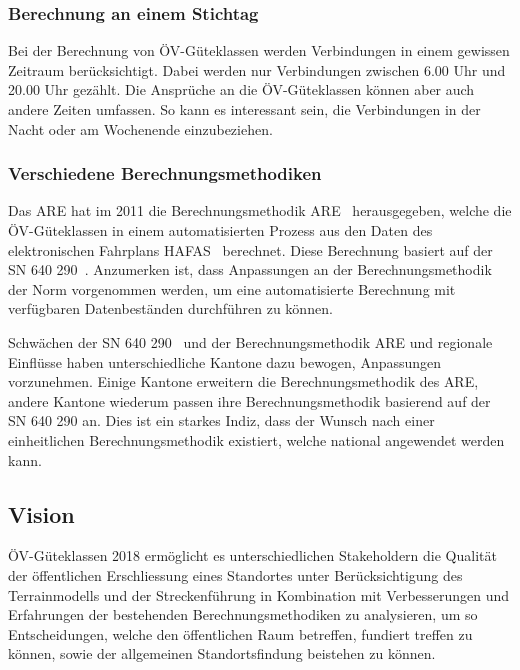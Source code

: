 \subsubsection{Berechnung an einem Stichtag}
\label{Problemstellung:Berechnung an einem Stichtag}

Bei der Berechnung von \acs{ÖV}-Güteklassen werden Verbindungen in einem gewissen Zeitraum berücksichtigt.
Dabei werden nur Verbindungen zwischen 6.00 Uhr und 20.00 Uhr gezählt.
Die Ansprüche an die \acs{ÖV}-Güteklassen können aber auch andere Zeiten umfassen.
So kann es interessant sein, die Verbindungen in der Nacht oder am Wochenende einzubeziehen.

\subsubsection{Verschiedene Berechnungsmethodiken}
\label{Problemstellung:Verschiedene Berechnungsmethodiken}

Das \ac{ARE} hat im 2011 die Berechnungsmethodik \acs{ARE}~\cite{berechnung_are} herausgegeben, welche die \acs{ÖV}-Güteklassen in einem automatisierten Prozess aus den Daten des elektronischen Fahrplans HAFAS~\cite{sbb_hafas_spec} berechnet.
Diese Berechnung basiert auf der \acs{SN} 640 290~\cite{sn640290}.
Anzumerken ist, dass Anpassungen an der Berechnungsmethodik der Norm vorgenommen werden, um eine automatisierte Berechnung mit verfügbaren Datenbeständen durchführen zu können.

Schwächen der \acs{SN} 640 290~\cite{sn640290} und der Berechnungsmethodik \acs{ARE} und regionale Einflüsse haben unterschiedliche Kantone dazu bewogen, Anpassungen vorzunehmen.
Einige Kantone erweitern die Berechnungsmethodik des \acs{ARE}, andere Kantone wiederum passen ihre Berechnungsmethodik basierend auf der \acs{SN} 640 290 an.
Dies ist ein starkes Indiz, dass der Wunsch nach einer einheitlichen Berechnungsmethodik existiert, welche national angewendet werden kann.

\subsection{Vision}
\label{Einführung:Vision}

\acs{ÖV}-Güteklassen 2018 ermöglicht es unterschiedlichen Stakeholdern die Qualität der öffentlichen Erschliessung eines Standortes unter Berücksichtigung des \gls{Terrainmodell}s und der Streckenführung in Kombination mit Verbesserungen und Erfahrungen der bestehenden Berechnungsmethodiken zu analysieren, um so Entscheidungen, welche den öffentlichen Raum betreffen, fundiert treffen zu können, sowie der allgemeinen Standortsfindung beistehen zu können.

